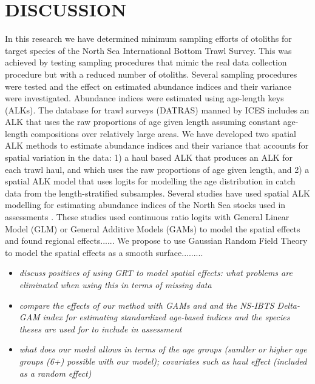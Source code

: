 \documentclass[a4paper 12pt]{article}
\numberwithin{equation}{section}
\begin{document}
\clearpage

\section{DISCUSSION}
\label{sec:discussion}

In this research we have determined minimum sampling efforts of otoliths for target species of the North Sea International Bottom Trawl Survey. This was achieved by testing sampling procedures that mimic the real data collection procedure but with a reduced number of otoliths. Several sampling procedures were tested and the effect on estimated abundance indices and their variance were investigated. Abundance indices were estimated using age-length keys (ALKs). The database for trawl surveys (DATRAS) manned by ICES includes an ALK that uses the raw proportions of age given length assuming constant age-length compositions over relatively large areas. We have developed two spatial ALK methods  to estimate abundance indices and their variance that accounts for spatial variation in the data: 1) a haul based ALK that produces an ALK for each trawl haul, and which uses the raw proportions of age given length, and 2) a spatial ALK model that uses logits for modelling the age distribution in catch data from the length-stratified  subsamples. Several studies have used spatial ALK modelling for estimating abundance indices of the North Sea stocks used in  assessments \citep{berg2012spatial, berg2014evaluation, gerritsen2006simple}. These studies used continuous ratio logits with General Linear Model (GLM) or General Additive Models (GAMs) to model the spatial effects and found regional effects...... We propose to use Gaussian Random Field Theory to model the spatial effects as a smooth surface.........

\begin{itemize}
\item \emph{discuss positives of using GRT to model spatial effects: what problems are eliminated when using this in terms of missing data}
\item \emph{compare the effects of our method with GAMs \citep{berg2012spatial} and \citep{berg2014evaluation} and the NS-IBTS Delta-GAM index for estimating standardized age-based indices and the species theses are used for to include in assessment}
\item \emph{what does our model allows in terms of the age groups (samller or higher age groups (6+) possible with our model); covariates such as haul effect (included as a random effect)}
\end{itemize}
\end{document}
